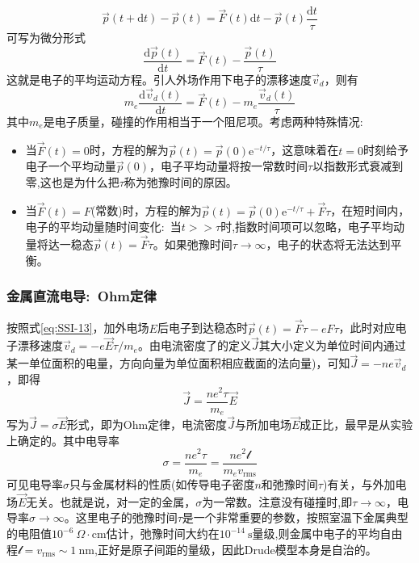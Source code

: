 \begin{equation}
	\vec p(t+\mathrm{d}t)-\vec p(t)=\vec F(t)\mathrm{d}t-\vec p(t)\dfrac{\mathrm{d}t}{\tau}
	\label{eq:Drude-electron_movement-2}
\end{equation} 
可写为微分形式
\begin{equation}
	\dfrac{\mathrm{d}\vec p(t)}{\mathrm{d}t}=\vec F(t)-\dfrac{\vec p(t)}{\tau}
	\label{eq:Drude-electron_movement-3}
\end{equation} 
这就是电子的平均运动方程。引人外场作用下电子的漂移速度$\vec v_d$，则有
\begin{equation}
	m_e\dfrac{\mathrm{d}\vec v_d(t)}{\mathrm{d}t}=\vec F(t)-m_e\dfrac{\vec v_d(t)}{\tau}
	\label{eq:SSI-13}
\end{equation} 
其中$m_e$是电子质量，碰撞的作用相当于一个阻尼项。考虑两种特殊情况:
\begin{itemize}
	\item 当$\vec F(t)=0$时，方程的解为$\vec p(t)=\vec p(0)\mathrm{e}^{-t/\tau}$，这意味着在$t=0$时刻给予电子一个平均动量$\vec p(0)$，电子平均动量将按一常数时间$\tau$以指数形式衰减到零,这也是为什么把$\tau$称为弛豫时间的原因。
	\item 当$\vec F(t)=F$(常数)时，方程的解为$\vec p(t)=\vec p(0)\mathrm{e}^{-t/\tau}+\vec F\tau$，在短时间内，电子的平均动量随时间变化:~当$t>>\tau$时,指数时间项可以忽略，电子平均动量将达一稳态$\vec p(t)=\vec F\tau$。如果弛豫时间$\tau\rightarrow\infty$，电子的状态将无法达到平衡。
\end{itemize}

\subsubsection{金属直流电导:~Ohm定律} 
按照式\eqref{eq:SSI-13}，加外电场$E$后电子到达稳态时$\vec p(t)=\vec F\tau-eF\tau$，此时对应电子漂移速度$\vec v_d=-e\vec E\tau/m_e$。由电流密度了的定义$\vec J$其大小定义为单位时间内通过某一单位面积的电量，方向向量为单位面积相应截面的法向量)，可知$\vec J=-ne\vec v_d$，即得
\begin{equation}
	\vec J=\dfrac{ne^2\tau}{m_e}\vec E
	\label{eq:Electron_current}
\end{equation} 
写为$\vec J=\sigma\vec E$形式，即为Ohm定律，电流密度$\vec J$与所加电场$\vec E$成正比，最早是从实验上确定的。其中电导率
\begin{equation}
	\sigma=\dfrac{ne^2\tau}{m_e}=\dfrac{ne^2\mathscr{l}}{m_ev_{\mathrm{rms}}}
	\label{eq:Electron_conduct}
\end{equation} 
可见电导率$\sigma$只与金属材料的性质(如传导电子密度$n$和弛豫时间$\tau$)有关，与外加电场$\vec E$无关。也就是说，对一定的金属，$\sigma$为一常数。注意没有碰撞时,即$\tau\rightarrow\infty$，电导率$\sigma\rightarrow\infty$。这里电子的弛豫时间$\tau$是一个非常重要的参数，按照室温下金属典型的电阻值$10^{-6}~\Omega\cdot\mathrm{cm}$估计，弛豫时间大约在$10^{-14}~\mathrm{s}$量级,则金属中电子的平均自由程$\mathscr{l}=v_{\mathrm{rms}}\sim1~\mathrm{nm}$,正好是原子间距的量级，因此Drude模型本身是自治的。

